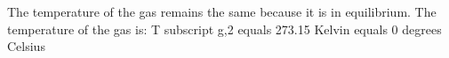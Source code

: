 The temperature of the gas remains the same because it is in equilibrium. The temperature of the gas is:  
T subscript g,2 equals 273.15 Kelvin equals 0 degrees Celsius